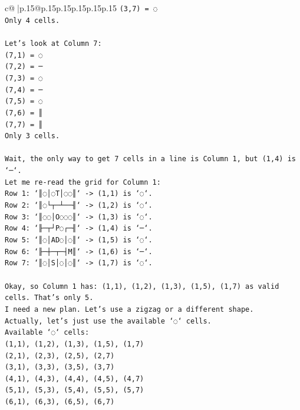 \documentclass{article}
\begin{document}
{\begin{supertabular}{c@{$\;$}|p{.15\linewidth}@{}p{.15\linewidth}p{.15\linewidth}p{.15\linewidth}p{.15\linewidth}p{.15\linewidth}}
{{{\texttt{(3,7) = ◌} \\
\texttt{Only 4 cells.} \\
\\ 
\texttt{Let's look at Column 7:} \\
\texttt{(7,1) = ◌} \\
\texttt{(7,2) = ─} \\
\texttt{(7,3) = ◌} \\
\texttt{(7,4) = ─} \\
\texttt{(7,5) = ◌} \\
\texttt{(7,6) = ║} \\
\texttt{(7,7) = ║} \\
\texttt{Only 3 cells.} \\
\\ 
\texttt{Wait, the only way to get 7 cells in a line is Column 1, but (1,4) is `─`.} \\
\texttt{Let me re{-}read the grid for Column 1:} \\
\texttt{Row 1: `║◌│◌T│◌◌║` {-}> (1,1) is `◌`.} \\
\texttt{Row 2: `║◌└┬─┴──╢` {-}> (1,2) is `◌`.} \\
\texttt{Row 3: `║◌◌│O◌◌◌║` {-}> (1,3) is `◌`.} \\
\texttt{Row 4: `╟─┬┘P◌┌─╢` {-}> (1,4) is `─`.} \\
\texttt{Row 5: `║◌│AD◌│◌║` {-}> (1,5) is `◌`.} \\
\texttt{Row 6: `╟─┼─┬─┤M║` {-}> (1,6) is `─`.} \\
\texttt{Row 7: `║◌│S│◌│◌║` {-}> (1,7) is `◌`.} \\
\\ 
\texttt{Okay, so Column 1 has: (1,1), (1,2), (1,3), (1,5), (1,7) as valid cells. That's only 5.} \\
\texttt{I need a new plan. Let's use a zigzag or a different shape.} \\
\texttt{Actually, let's just use the available `◌` cells.} \\
\texttt{Available `◌` cells:} \\
\texttt{(1,1), (1,2), (1,3), (1,5), (1,7)} \\
\texttt{(2,1), (2,3), (2,5), (2,7)} \\
\texttt{(3,1), (3,3), (3,5), (3,7)} \\
\texttt{(4,1), (4,3), (4,4), (4,5), (4,7)} \\
\texttt{(5,1), (5,3), (5,4), (5,5), (5,7)} \\
\texttt{(6,1), (6,3), (6,5), (6,7)} \\
}}}
\end{supertabular}}
\end{document}
